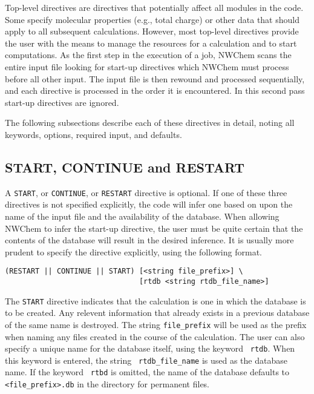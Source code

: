 \label{sec:toplevel}

Top-level directives are directives that potentially affect all
modules in the code.  Some specify molecular properties (e.g., total
charge) or other data that should apply to all subsequent
calculations.  However, most top-level directives provide the user
with the means to manage the resources for a calculation and to start
computations.  As the first step in the execution of a job, NWChem
scans the entire input file looking for start-up directives which
NWChem must process before all other input.  The input file is then
rewound and processed sequentially, and each directive is processed in
the order it is encountered.  In this second pass start-up directives
are ignored.

The following subsections describe each of these directives in detail,
noting all keywords, options, required input, and defaults.

\subsection{START, CONTINUE and RESTART}
\label{sec:start}

A {\tt START}, or {\tt CONTINUE}, or {\tt RESTART} directive is
optional.  If one of these three directives is not specified
explicitly, the code will infer one based on upon the name of the
input file and the availability of the database.  When allowing NWChem
to infer the start-up directive, the user must be quite certain that
the contents of the database will result in the desired inference.  It
is usually more prudent to specify the directive explicitly, using the
following format.

\begin{verbatim}
(RESTART || CONTINUE || START) [<string file_prefix>] \
                               [rtdb <string rtdb_file_name>]
\end{verbatim}

The \verb+START+ directive indicates that the calculation is one in
which the database is to be created.  Any relevent information that
already exists in a previous database of the same name is destroyed.
The string {\tt file\_prefix} will be used as the prefix when naming
any files created in the course of the calculation.  The user can also
specify a unique name for the database itself, using the keyword {\tt
  rtdb}.  When this keyword is entered, the string {\tt
  rtdb\_file\_name} is used as the database name.  If the keyword {\tt
  rtbd} is omitted, the name of the database defaults to
\verb+<file_prefix>.db+ in the directory for permanent files.

